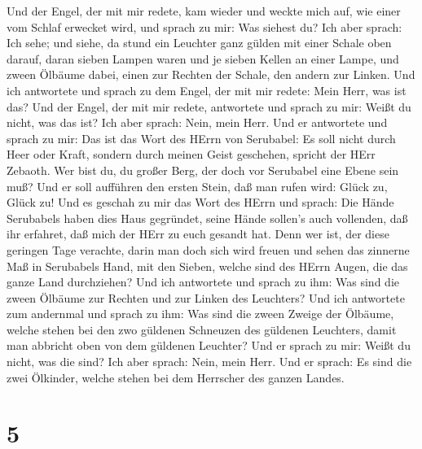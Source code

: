  Und der Engel, der mit mir redete, kam wieder und weckte
mich auf, wie einer vom Schlaf erwecket wird,  und sprach zu
mir: Was siehest du? Ich aber sprach: Ich sehe; und siehe, da stund ein
Leuchter ganz gülden mit einer Schale oben darauf, daran sieben Lampen
waren und je sieben Kellen an einer Lampe,  und zween
Ölbäume dabei, einen zur Rechten der Schale, den andern zur Linken.
 Und ich antwortete und sprach zu dem Engel, der mit mir
redete: Mein Herr, was ist das?  Und der Engel, der mit mir
redete, antwortete und sprach zu mir: Weißt du nicht, was das ist? Ich
aber sprach: Nein, mein Herr.  Und er antwortete und sprach
zu mir: Das ist das Wort des HErrn von Serubabel: Es soll nicht durch
Heer oder Kraft, sondern durch meinen Geist geschehen, spricht der HErr
Zebaoth.  Wer bist du, du großer Berg, der doch vor
Serubabel eine Ebene sein muß? Und er soll aufführen den ersten Stein,
daß man rufen wird: Glück zu, Glück zu!  Und es geschah zu
mir das Wort des HErrn und sprach:  Die Hände Serubabels
haben dies Haus gegründet, seine Hände sollen's auch vollenden, daß ihr
erfahret, daß mich der HErr zu euch gesandt hat.  Denn wer
ist, der diese geringen Tage verachte, darin man doch sich wird freuen
und sehen das zinnerne Maß in Serubabels Hand, mit den Sieben, welche
sind des HErrn Augen, die das ganze Land durchziehen?  Und
ich antwortete und sprach zu ihm: Was sind die zween Ölbäume zur Rechten
und zur Linken des Leuchters?  Und ich antwortete zum
andernmal und sprach zu ihm: Was sind die zween Zweige der Ölbäume,
welche stehen bei den zwo güldenen Schneuzen des güldenen Leuchters,
damit man abbricht oben von dem güldenen Leuchter?  Und er
sprach zu mir: Weißt du nicht, was die sind? Ich aber sprach: Nein, mein
Herr.  Und er sprach: Es sind die zwei Ölkinder, welche
stehen bei dem Herrscher des ganzen Landes.

\hypertarget{section-4}{%
\section{5}\label{section-4}}

